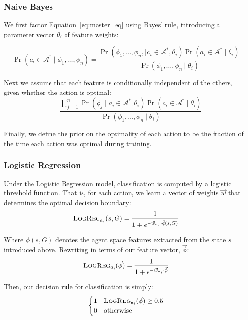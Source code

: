 \documentclass[11pt]{article}
\begin{document}
\subsubsection{Naive Bayes}
We first factor Equation~\ref{eq:master_eq} using Bayes' rule, introducing a parameter vector $\theta_i$ of
feature weights:

\begin{equation}
\Pr(a_i \in \mathcal{A}^*  \mid \phi_1, \ldots, \phi_n) = \frac{\Pr(\phi_1, \ldots, \phi_{n}, \mid a_i \in \mathcal{A}^*, \theta_i) \Pr(a_i \in \mathcal{A}^* \mid \theta_i)}{\Pr(\phi_1, \ldots, \phi_{n} \mid \theta_i)}
\label{eq:bayes}
\end{equation}

Next we assume that each feature is conditionally independent of the others, given whether the action is optimal:
\begin{equation}
= \frac{\prod_{j=1}^{n} \Pr(\phi_j \mid a_i \in \mathcal{A}^*, \theta_i) \Pr(a_i \in \mathcal{A}^* \mid \theta_i) }{\Pr(\phi_1, \ldots, \phi_{n} \mid \theta_i)}
\label{eq:final}
\end{equation}

Finally, we define the prior on the optimality of each action to be
the fraction of the time each action was optimal during training.

\subsubsection{Logistic Regression}

Under the Logistic Regression model, classification is computed by a logistic threshold function. That is, for each action, we learn a vector of weights $\vec{w}$ that determines the optimal decision boundary:
\begin{equation}
\textsc{LogReg}_{a_i}(s, G) = \frac{1}{1 + e^{-\vec{w}_{a_i} \cdot \vec{\phi}(s, G)}}
\end{equation}

Where $\phi(s,G)$ denotes the agent space features extracted from the state $s$ introduced above. Rewriting in terms of our feature vector, $\vec{\phi}$:
\begin{equation}
\textsc{LogReg}_{a_i}(\vec{\phi}) = \frac{1}{1 + e^{-\vec{w}_{a_i} \cdot \vec{\phi}}}
\end{equation}

Then, our decision rule for classification is simply:
\begin{equation}
\begin{cases}
1&\textsc{LogReg}_{a_i}(\vec{\phi}) \geq 0.5 \\
0&\text{otherwise}
\end{cases}
\end{equation}
\end{document}
